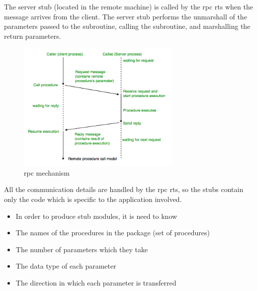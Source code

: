 \documentclass[a4paper, 12pt]{article} %
\begin{document}
                The server stub (located in the remote machine) is called by the \acrshort{rpc} \acrshort{rts} when the message arrives from the client. The server stub performs the unmarshall of the parameters passed to the subroutine, calling the subroutine, and marshalling the return parameters. 
                \begin{figure}[h]
                    \centering
                    \includegraphics[width=0.7\textwidth]{rpc-mecha.png}
                    \caption{\acrshort{rpc} mechanism}
                    \label{fig:rpc_mechanism}
                \end{figure}
                All the communication details are handled by the \acrshort{rpc} \acrshort{rts}, so the stubs contain only the code which is specific to the application involved\cite{rpc2}.
                \begin{itemize}
                    \item In order to produce stub modules, it is need to know
                    \item The names of the procedures in the package (set of procedures)
                    \item The number of parameters which they take
                    \item The data type of each parameter
                    \item The direction in which each parameter is transferred
                \end{itemize}
\end{document}

